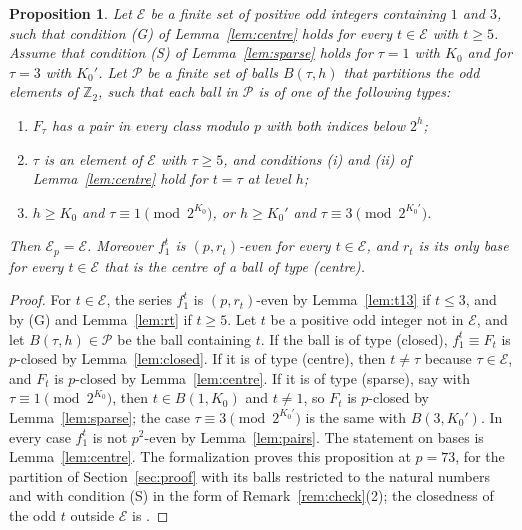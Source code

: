 \documentclass[12pt]{amsart}
\newtheorem{proposition}[theorem]{Proposition}
\theoremstyle{definition}
\newcommand{\Zt}{\mathbb{Z}_2}
\newcommand{\cE}{\mathcal{E}}
\newcommand{\B}{B}
\newcommand{\lean}[1]{\ignorespaces}
\begin{document}
\begin{proposition}\label{prop:cert}
\lean{\decl{KeithZanello.closed_of_not_mem_E73}, at $p=73$, for the partition of Section~\ref{sec:proof} with its balls restricted to the natural numbers, with condition (S) in the form of Remark~\ref{rem:check}(2) and condition (G) as the hypothesis \decl{KeithZanello.CentreHyp}; it gives Theorem~\ref{thm:73} through \decl{KeithZanello.mainClaimG}}
Let $\cE$ be a finite set of positive odd integers containing $1$ and $3$, such that condition (G) of Lemma~\ref{lem:centre} holds for every $t\in\cE$ with $t\ge5$. Assume that condition (S) of Lemma~\ref{lem:sparse} holds for $\tau=1$ with $K_0$ and for $\tau=3$ with $K_0'$. Let $\mathcal{P}$ be a finite set of balls $\B(\tau,h)$ that partitions the odd elements of $\Zt$, such that each ball in $\mathcal{P}$ is of one of the following types:
\begin{enumerate}
\item[(closed)] $F_\tau$ has a pair in every class modulo $p$ with both indices below $2^h$;
\item[(centre)] $\tau$ is an element of $\cE$ with $\tau\ge5$, and conditions (i) and (ii) of Lemma~\ref{lem:centre} hold for $t=\tau$ at level $h$;
\item[(sparse)] $h\ge K_0$ and $\tau\equiv1\pmod{2^{K_0}}$, or $h\ge K_0'$ and $\tau\equiv3\pmod{2^{K_0'}}$.
\end{enumerate}
Then $\cE_p=\cE$. Moreover $f_1^t$ is $(p,r_t)$-even for every $t\in\cE$, and $r_t$ is its only base for every $t\in\cE$ that is the centre of a ball of type (centre).
\end{proposition}

\begin{proof}
For $t\in\cE$, the series $f_1^t$ is $(p,r_t)$-even by Lemma~\ref{lem:t13} if $t\le3$, and by (G) and Lemma~\ref{lem:rt} if $t\ge5$. Let $t$ be a positive odd integer not in $\cE$, and let $\B(\tau,h)\in\mathcal{P}$ be the ball containing $t$. If the ball is of type (closed), $f_1^t\equiv F_t$ is $p$-closed by Lemma~\ref{lem:closed}. If it is of type (centre), then $t\ne\tau$ because $\tau\in\cE$, and $F_t$ is $p$-closed by Lemma~\ref{lem:centre}. If it is of type (sparse), say with $\tau\equiv1\pmod{2^{K_0}}$, then $t\in\B(1,K_0)$ and $t\ne1$, so $F_t$ is $p$-closed by Lemma~\ref{lem:sparse}; the case $\tau\equiv3\pmod{2^{K_0'}}$ is the same with $\B(3,K_0')$. In every case $f_1^t$ is not $p^2$-even by Lemma~\ref{lem:pairs}. The statement on bases is Lemma~\ref{lem:centre}. The formalization proves this proposition at $p=73$, for the partition of Section~\ref{sec:proof} with its balls restricted to the natural numbers and with condition (S) in the form of Remark~\ref{rem:check}(2); the closedness of the odd $t$ outside $\cE$ is .
\end{proof}
\end{document}
